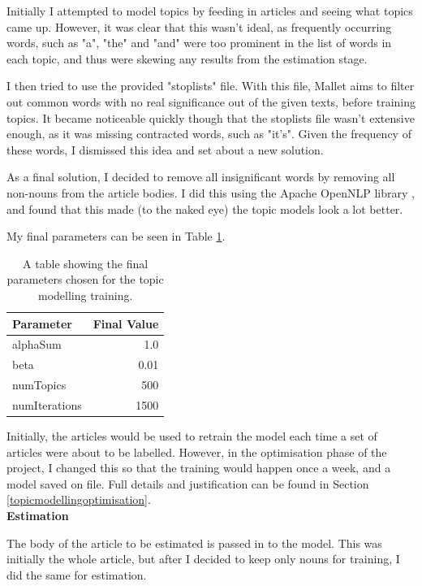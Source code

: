 \documentclass[12pt]{article}
\begin{document}
Initially I attempted to model topics by feeding in articles and seeing what topics came up. However, it was clear that this wasn't ideal, as frequently occurring words, such as "a", "the" and "and" were too prominent in the list of words in each topic, and thus were skewing any results from the estimation stage.

I then tried to use the provided "stoplists" file. With this file, Mallet aims to filter out common words with no real significance out of the given texts, before training topics. It became noticeable quickly though that the stoplists file wasn't extensive enough, as it was missing contracted words, such as "it's". Given the frequency of these words, I dismissed this idea and set about a new solution.

As a final solution, I decided to remove all insignificant words by removing all non-nouns from the article bodies. I did this using the Apache OpenNLP library \cite{opennlp}, and found that this made (to the naked eye) the topic models look a lot better. 

My final parameters can be seen in Table \ref{topicmodellingtraining}.

\begin{table}[H]
	\centering
	\begin{tabular}{l|r}
		\textbf{Parameter} & \textbf{Final Value} \\ \hline
		alphaSum & 1.0 \\ \hline
		beta & 0.01 \\ \hline
		numTopics & 500 \\ \hline
		numIterations & 1500 \\ \hline
	\end{tabular}
	\caption[Parameters for training topic models]{A table showing the final parameters chosen for the topic modelling training.}
	\label{topicmodellingtraining}
\end{table}

Initially, the articles would be used to retrain the model each time a set of articles were about to be labelled. However, in the optimisation phase of the project, I changed this so that the training would happen once a week, and a model saved on file. Full details and justification can be found in Section \ref{topicmodellingoptimisation}. \\

\textbf{Estimation}

The body of the article to be estimated is passed in to the model. This was initially the whole article, but after I decided to keep only nouns for training, I did the same for estimation. 
\end{document}
